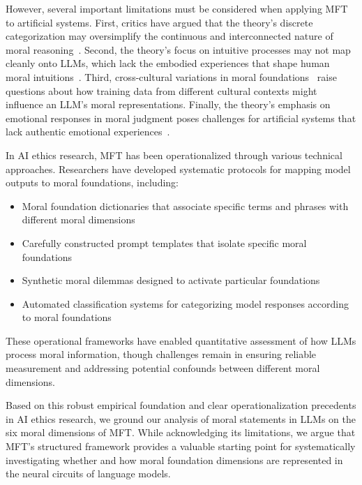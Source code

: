 However, several important limitations must be considered when applying MFT to artificial systems. First, critics have argued that the theory's discrete categorization may oversimplify the continuous and interconnected nature of moral reasoning~\cite{Suhler2011}. Second, the theory's focus on intuitive processes may not map cleanly onto LLMs, which lack the embodied experiences that shape human moral intuitions~\cite{Gray2022}. Third, cross-cultural variations in moral foundations~\cite{Davis2016} raise questions about how training data from different cultural contexts might influence an LLM's moral representations. Finally, the theory's emphasis on emotional responses in moral judgment poses challenges for artificial systems that lack authentic emotional experiences~\cite{Cameron2015}.


In AI ethics research, MFT has been operationalized through various technical approaches. Researchers have developed systematic protocols for mapping model outputs to moral foundations, including:
\begin{itemize}
\item Moral foundation dictionaries that associate specific terms and phrases with different moral dimensions~\cite{Hopp2021}
\item Carefully constructed prompt templates that isolate specific moral foundations~\cite{Askell2021}
\item Synthetic moral dilemmas designed to activate particular foundations~\cite{Hendrycks2021}
\item Automated classification systems for categorizing model responses according to moral foundations~\cite{Schramowski2022}
\end{itemize}

These operational frameworks have enabled quantitative assessment of how LLMs process moral information, though challenges remain in ensuring reliable measurement and addressing potential confounds between different moral dimensions.

Based on this robust empirical foundation and clear operationalization precedents in AI ethics research, we ground our analysis of moral statements in LLMs on the six moral dimensions of MFT. While acknowledging its limitations, we argue that MFT's structured framework provides a valuable starting point for systematically investigating whether and how moral foundation dimensions are represented in the neural circuits of language models.






